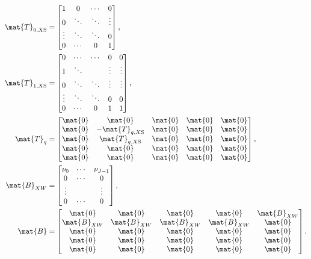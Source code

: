 \documentclass{jpmarticle}
\let\subequationsorig\subequations%
\let\endsubequationsorig\endsubequations%
\renewenvironment{subequations}{
  \subequationsorig
  \renewcommand{\theequation}{\theparentequation.\arabic{equation}}
}{
  \endsubequationsorig
}
\begin{document}
\begin{subequations}
\begin{align}
    \mat{T}_{0, X\mathrm{S}} &=
    \begin{bmatrix}
      1 & 0 & \cdots & 0
      \\
      0 & \ddots & \ddots & \vdots
      \\
      \vdots & \ddots & \ddots & 0
      \\
      0 & \cdots & 0 & 1
    \end{bmatrix},
    \\
    \mat{T}_{1, X\mathrm{S}} &=
    \begin{bmatrix}
      0 & \cdots & \cdots & 0 & 0
      \\
      1 & \ddots & & \vdots & \vdots
      \\
      0 & \ddots & \ddots & \vdots & \vdots
      \\
      \vdots & \ddots & \ddots & 0 & 0
      \\
      0 & \cdots & 0 & 1 & 1
    \end{bmatrix},
    \\
    \mat{T}_q &=
    \begin{bmatrix}
      \mat{0} & \mat{0} & \mat{0} & \mat{0} & \mat{0}
      \\
      \mat{0} & - \mat{T}_{q, X\mathrm{S}} & \mat{0} & \mat{0} & \mat{0}
      \\
      \mat{0} & \mat{T}_{q, X\mathrm{S}} & \mat{0} & \mat{0} & \mat{0}
      \\
      \mat{0} & \mat{0} & \mat{0} & \mat{0} & \mat{0}
      \\
      \mat{0} & \mat{0} & \mat{0} & \mat{0} & \mat{0}
    \end{bmatrix},
    \\
    \mat{B}_{XW} &=
    \begin{bmatrix}
      \nu_0 & \cdots & \nu_{J - 1} \\
      0 & \cdots & 0 \\
      \vdots & & \vdots \\
      0 & \cdots & 0
    \end{bmatrix},
    \\
    \mat{B} &=
    \begin{bmatrix}
      \mat{0} & \mat{0} & \mat{0} & \mat{0} & \mat{B}_{XW}
      \\
      \mat{B}_{XW} & \mat{B}_{XW} & \mat{B}_{XW} & \mat{B}_{XW} & \mat{0}
      \\
      \mat{0} & \mat{0} & \mat{0} & \mat{0} & \mat{0}
      \\
      \mat{0} & \mat{0} & \mat{0} & \mat{0} & \mat{0}
      \\
      \mat{0} & \mat{0} & \mat{0} & \mat{0} & \mat{0}
    \end{bmatrix}.
  \end{align}
\end{subequations}
\end{document}
